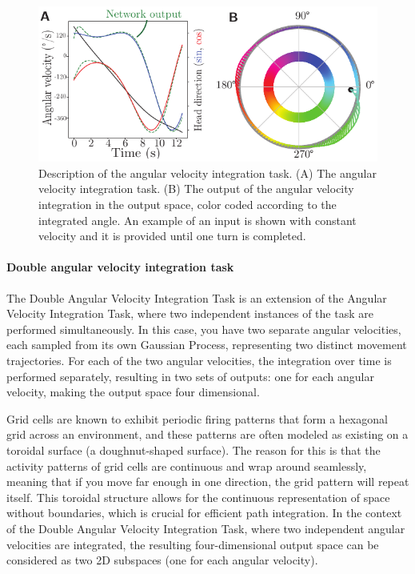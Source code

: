\documentclass{article} %
\newcounter{ct}
\theoremstyle{definition}
\theoremstyle{remark}
\begin{document}
 \begin{figure}[tbhp]
     \centering
    \includegraphics[width=\textwidth]{task_fig}
       \caption{Description of the angular velocity integration task.
        (A) The angular velocity integration task.
        (B) The output of the angular velocity integration in the output space, color coded according to the integrated angle. An example of an input is shown with constant velocity and it is provided until one turn is completed.
        }\label{fig:angular_task}
\end{figure}

\paragraph{Double angular velocity integration task}
The Double Angular Velocity Integration Task is an extension of the Angular Velocity Integration Task, where two independent instances of the task are performed simultaneously. In this case, you have two separate angular velocities, each sampled from its own Gaussian Process, representing two distinct movement trajectories.
%
For each of the two angular velocities, the integration over time is performed separately, resulting in two sets of outputs: one for each angular velocity, making the output space four dimensional.

Grid cells are known to exhibit periodic firing patterns that form a hexagonal grid across an environment, and these patterns are often modeled as existing on a toroidal surface (a doughnut-shaped surface)\citep{hermansen2024uncovering}. The reason for this is that the activity patterns of grid cells are continuous and wrap around seamlessly, meaning that if you move far enough in one direction, the grid pattern will repeat itself. This toroidal structure allows for the continuous representation of space without boundaries, which is crucial for efficient path integration.
In the context of the Double Angular Velocity Integration Task, where two independent angular velocities are integrated, the resulting four-dimensional output space can be considered as two 2D subspaces (one for each angular velocity).
\end{document}
